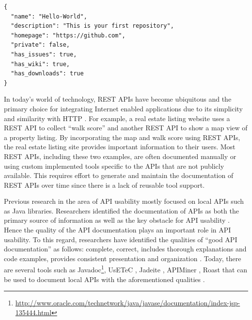 \begin{verbatim}
{
  "name": "Hello-World",
  "description": "This is your first repository",
  "homepage": "https://github.com",
  "private": false,
  "has_issues": true,
  "has_wiki": true,
  "has_downloads": true
}
\end{verbatim}

In today's world of technology, REST APIs have become ubiquitous and the primary choice for integrating Internet enabled applications due to its simplicity and similarity with HTTP \cite{mangler2010origin}. For example, a real estate listing website uses a REST API to collect ``walk score'' and another REST API to show a map view of a property listing. By incorporating the map and walk score using REST APIs, the real estate listing site provides important information to their users. Most REST APIs, including these two examples, are often documented manually or using custom implemented tools specific to the APIs that are not publicly available. This requires effort to generate and maintain the documentation of REST APIs over time since there is a lack of reusable tool support.

Previous research in the area of API usability mostly focused on local APIs such as Java libraries. Researchers identified the documentation of APIs as both the primary source of information as well as the key obstacle for API usability \cite{Robillard_what_makes}. Hence the quality of the API documentation plays an important role in API usability. To this regard, researchers have identified the qualities of ``good API documentation'' as follows: complete, correct, includes thorough explanations and code examples, provides consistent presentation and organization \cite{Robillard_what_makes,Myers_study}. Today, there are several tools such as Javadoc\footnote{\url{http://www.oracle.com/technetwork/java/javase/documentation/index-jsp-135444.html}}, UsETeC \cite{zhu2014mining}, Jadeite \cite{Jadeite}, APIMiner \cite{montandon2013documenting}, Roast \cite{Hoffman_api_documentation} that can be used to document local APIs with the aforementioned qualities .

